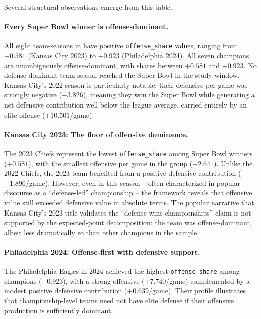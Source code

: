 Several structural observations emerge from this table.

\paragraph{Every Super Bowl winner is offense-dominant.}
All eight team-seasons in  have positive
\texttt{offense\_share} values, ranging from $+0.581$ (Kansas City 2023) to
$+0.923$ (Philadelphia 2024). All seven champions are unambiguously
offense-dominant, with shares between $+0.581$ and $+0.923$. No
defense-dominant team-season reached the Super Bowl in the study window.
Kansas City's 2022 season is particularly notable: their defensive \xvoa{} per
game was strongly negative ($-3.826$), meaning they won the Super Bowl while
generating a net defensive contribution well below the league average, carried
entirely by an elite offense ($+10.501$/game).

\paragraph{Kansas City 2023: The floor of offensive dominance.}
The 2023 Chiefs represent the lowest \texttt{offense\_share} among Super Bowl
winners ($+0.581$), with the smallest offensive \xvoa{} per game in the group
($+2.641$). Unlike the 2022 Chiefs, the 2023 team benefited from a positive
defensive contribution ($+1.896$/game). However, even in this season -- often
characterized in popular discourse as a ``defense-led'' championship -- the
\gds{} framework reveals that offensive value still exceeded defensive value
in absolute terms. The popular narrative that Kansas City's 2023 title validates
the ``defense wins championships'' claim is not supported by the expected-point
decomposition: the team was offense-dominant, albeit less dramatically so than
other champions in the sample.

\paragraph{Philadelphia 2024: Offense-first with defensive support.}
The Philadelphia Eagles in 2024 achieved the highest \texttt{offense\_share}
among champions ($+0.923$), with a strong offensive \xvoa{} ($+7.740$/game)
complemented by a modest positive defensive contribution ($+0.639$/game).
Their profile illustrates that championship-level teams need not have elite
defense if their offensive production is sufficiently dominant.

